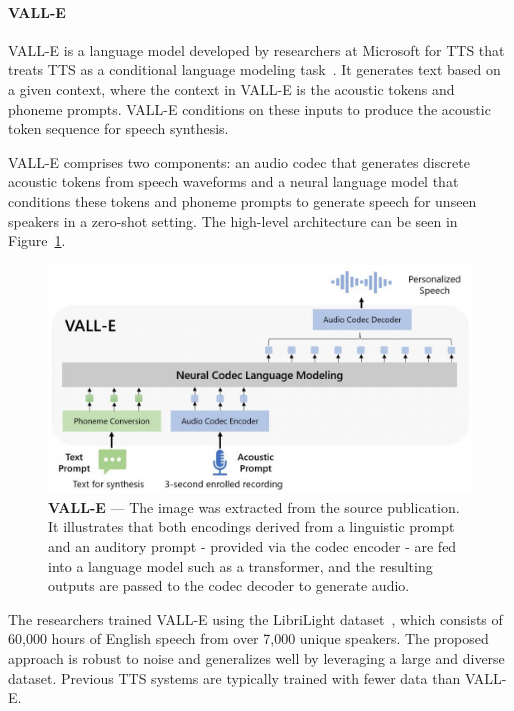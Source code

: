 \paragraph{VALL-E}

VALL-E is a language model developed by researchers at Microsoft for \ac{TTS} that treats \ac{TTS} as a conditional language modeling task~\cite{wang_neural_2023}. It generates text based on a given context, where the context in VALL-E is the acoustic tokens and phoneme prompts. VALL-E conditions on these inputs to produce the acoustic token sequence for speech synthesis.

VALL-E comprises two components: an audio codec that generates discrete acoustic tokens from speech waveforms and a neural language model that conditions these tokens and phoneme prompts to generate speech for unseen speakers in a zero-shot setting. The high-level architecture can be seen in Figure~\ref{fig:vall-e}.

\begin{figure}[ht]
    \centering
    \includegraphics[width=\textwidth]{figures/2-sota/vall-e.jpg}
    \caption[VALL-E]{\textbf{VALL-E} --- The image was extracted from the source publication. It illustrates that both encodings derived from a linguistic prompt and an auditory prompt - provided via the codec encoder - are fed into a language model such as a transformer, and the resulting outputs are passed to the codec decoder to generate audio.}
    \label{fig:vall-e}
\end{figure}

The researchers trained VALL-E using the LibriLight dataset~\cite{kahn_libri-light_2020}, which consists of 60,000 hours of English speech from over 7,000 unique speakers. The proposed approach is robust to noise and generalizes well by leveraging a large and diverse dataset. Previous \ac{TTS} systems are typically trained with fewer data than VALL-E.

